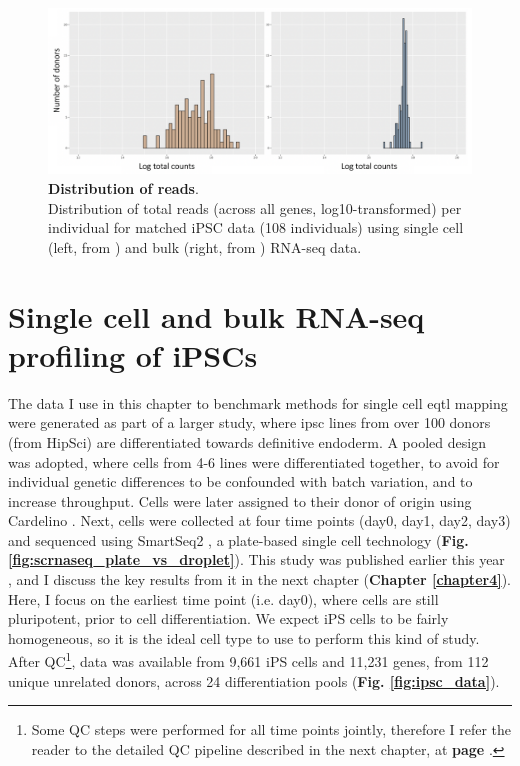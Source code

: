 \begin{figure}[h]
\centering
\includegraphics[width=13cm]{Chapter3/Fig/count_distribution_sc_vs_bulk.png}
\caption[Distribution of reads]{\textbf{Distribution of reads}.\\
Distribution of total reads (across all genes, log10-transformed) per individual for matched iPSC data (108 individuals) using single cell (left, from \cite{cuomo2020single}) and bulk (right, from \cite{mirauta2018population}) RNA-seq data.}
\label{fig:sc_bulk_counts}
\end{figure}

\section{Single cell and bulk RNA-seq profiling of iPSCs}

The data I use in this chapter to benchmark methods for single cell \gls{eqtl} mapping were generated as part of a larger study, where \gls{ipsc} lines from over 100 donors (from HipSci) are differentiated towards definitive endoderm.
A pooled design was adopted, where cells from 4-6 lines were differentiated together, to avoid for individual genetic differences to be confounded with batch variation, and to increase throughput. 
Cells were later assigned to their donor of origin using Cardelino \cite{mccarthy2020cardelino}. 
Next, cells were collected at four time points (day0, day1, day2, day3) and sequenced using SmartSeq2 \cite{picelli2013smart}, a plate-based single cell technology (\textbf{Fig. \ref{fig:scrnaseq_plate_vs_droplet}}).
This study was published earlier this year \cite{cuomo2020single}, and I discuss the key results from it in the next chapter (\textbf{Chapter \ref{chapter4}}). \\

Here, I focus on the earliest time point (i.e. day0), where cells are still pluripotent, prior to cell differentiation.
We expect iPS cells to be fairly homogeneous, so it is the ideal cell type to use to perform this kind of study.
After QC\footnote{Some QC steps were performed for all time points jointly, therefore I refer the reader to the detailed QC pipeline described in the next chapter, at \textbf{page \pageref{fig:endodiff_qc_workflow}}.}, data was available from 9,661 iPS cells and 11,231 genes, from 112 unique unrelated donors, across 24 differentiation pools (\textbf{Fig. \ref{fig:ipsc_data}}).


